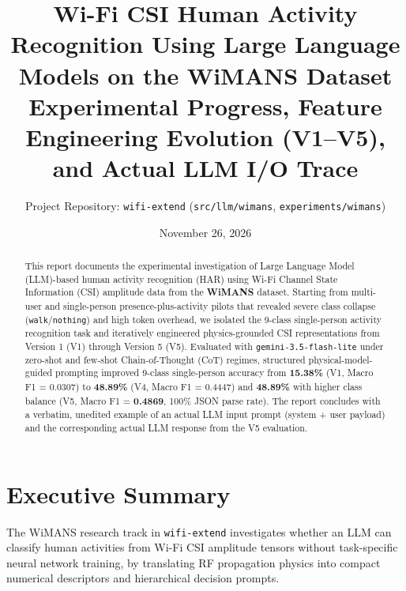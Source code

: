 \documentclass[11pt,a4paper]{article}
\title{\textbf{Wi-Fi CSI Human Activity Recognition Using Large Language Models on the WiMANS Dataset}\\[0.5em]
\large Experimental Progress, Feature Engineering Evolution (V1--V5), and Actual LLM I/O Trace}
\author{Project Repository: \texttt{wifi-extend} (\texttt{src/llm/wimans}, \texttt{experiments/wimans})}
\date{November 26, 2026}
\begin{document}
\sloppy

\maketitle

\begin{abstract}
This report documents the experimental investigation of Large Language Model (LLM)-based human activity recognition (HAR) using Wi-Fi Channel State Information (CSI) amplitude data from the \textbf{WiMANS} dataset. Starting from multi-user and single-person presence-plus-activity pilots that revealed severe class collapse (\texttt{walk}/\texttt{nothing}) and high token overhead, we isolated the 9-class single-person activity recognition task and iteratively engineered physics-grounded CSI representations from Version 1 (V1) through Version 5 (V5). Evaluated with \texttt{gemini-3.5-flash-lite} under zero-shot and few-shot Chain-of-Thought (CoT) regimes, structured physical-model-guided prompting improved 9-class single-person accuracy from \textbf{15.38\%} (V1, Macro F1 = 0.0307) to \textbf{48.89\%} (V4, Macro F1 = 0.4447) and \textbf{48.89\%} with higher class balance (V5, Macro F1 = \textbf{0.4869}, 100\% JSON parse rate). The report concludes with a verbatim, unedited example of an actual LLM input prompt (system + user payload) and the corresponding actual LLM response from the V5 evaluation.
\end{abstract}

\newpage
\tableofcontents
\newpage

\section{Executive Summary}
The WiMANS research track in \texttt{wifi-extend} investigates whether an LLM can classify human activities from Wi-Fi CSI amplitude tensors without task-specific neural network training, by translating RF propagation physics into compact numerical descriptors and hierarchical decision prompts.
\end{document}
